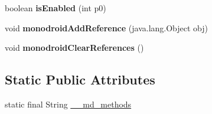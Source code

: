 \begin{DoxyCompactItemize}
\item 
\mbox{\label{classmd5b60ffeb829f638581ab2bb9b1a7f4f3f_1_1TableViewModelRenderer_aef3b0c0ebeeaef7cf5f3071788276cbc}} 
boolean {\bfseries is\+Enabled} (int p0)
\item 
\mbox{\label{classmd5b60ffeb829f638581ab2bb9b1a7f4f3f_1_1TableViewModelRenderer_af694d5eaa766065b71fdc6e4204b904d}} 
void {\bfseries monodroid\+Add\+Reference} (java.\+lang.\+Object obj)
\item 
\mbox{\label{classmd5b60ffeb829f638581ab2bb9b1a7f4f3f_1_1TableViewModelRenderer_a92f10ed6c4706c14be7fcc1b40449cb2}} 
void {\bfseries monodroid\+Clear\+References} ()
\end{DoxyCompactItemize}
\subsection*{Static Public Attributes}
\begin{DoxyCompactItemize}
\item 
static final String \hyperlink{classmd5b60ffeb829f638581ab2bb9b1a7f4f3f_1_1TableViewModelRenderer_a21b72c97f46fee0f30a471fc36c20e2c}{\+\_\+\+\_\+md\+\_\+methods}
\end{DoxyCompactItemize}

